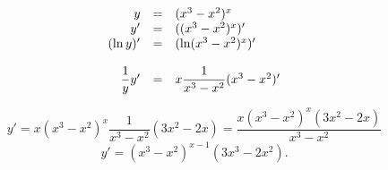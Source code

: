 {}

$$
  \begin{array}{r c l}
    y  & = & (x^3-x^2)^x \\
    y' & = & ((x^3-x^2)^x)' \\
    (\ln y)' & = & (\ln(x^3-x^2)^x)' \\
    \\
    \dfrac{1}{y}y' & = & x \dfrac{1}{x^3-x^2}(x^3-x^2)' \\
  \end{array}
$$

$$
  y' = x(x^3-x^2)^x \dfrac{1}{x^3-x^2}(3x^2-2x)
      = \dfrac{x (x^3-x^2)^x(3x^2-2x)}{x^3-x^2}
$$
$$
  y' = (x^3-x^2)^{x-1}(3x^3-2x^2).
$$

